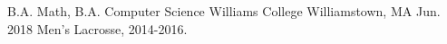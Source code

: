 \begin{cventries}
  \begin{cventry}
    {B.A. Math, B.A. Computer Science} %
    {Williams College} %
    {Williamstown, MA} %
    {Jun. 2018} %
    {Men's Lacrosse, 2014-2016.}
    {}
  \end{cventry}
\end{cventries}

